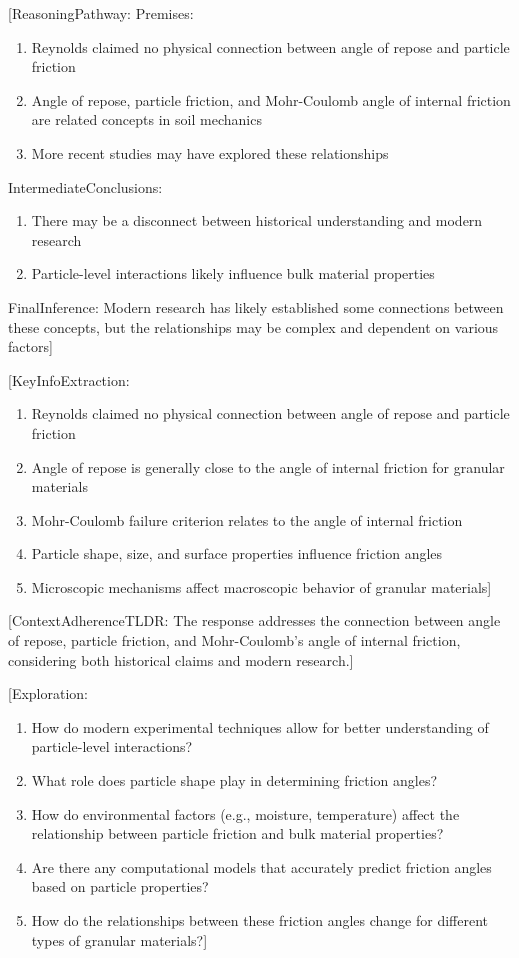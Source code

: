 \documentclass[xcolor=dvipsnames,10pt,hidelinks]{article}
\begin{document}
\begin{itemize}
{[}ReasoningPathway:
Premises:
\begin{enumerate}
\item Reynolds claimed no physical connection between angle of repose and particle friction
\item Angle of repose, particle friction, and Mohr-Coulomb angle of internal friction are related concepts in soil mechanics
\item More recent studies may have explored these relationships
\end{enumerate}
IntermediateConclusions:
\begin{enumerate}
\item There may be a disconnect between historical understanding and modern research
\item Particle-level interactions likely influence bulk material properties
\end{enumerate}
FinalInference: Modern research has likely established some connections between these concepts, but the relationships may be complex and dependent on various factors]

{[}KeyInfoExtraction:
\begin{enumerate}
\item Reynolds claimed no physical connection between angle of repose and particle friction
\item Angle of repose is generally close to the angle of internal friction for granular materials
\item Mohr-Coulomb failure criterion relates to the angle of internal friction
\item Particle shape, size, and surface properties influence friction angles
\item Microscopic mechanisms affect macroscopic behavior of granular materials]
\end{enumerate}

{[}ContextAdherenceTLDR: The response addresses the connection between angle of repose, particle friction, and Mohr-Coulomb's angle of internal friction, considering both historical claims and modern research.]

{[}Exploration:
\begin{enumerate}
\item How do modern experimental techniques allow for better understanding of particle-level interactions?
\item What role does particle shape play in determining friction angles?
\item How do environmental factors (e.g., moisture, temperature) affect the relationship between particle friction and bulk material properties?
\item Are there any computational models that accurately predict friction angles based on particle properties?
\item How do the relationships between these friction angles change for different types of granular materials?]
\end{enumerate}


\end{itemize}
\end{document}
